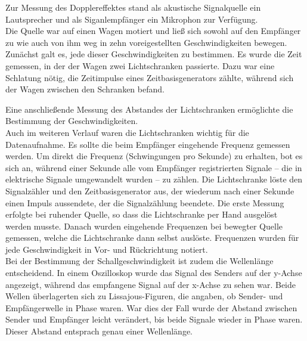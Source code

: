 Zur Messung des Dopplereffektes stand als akustische Signalquelle ein Lautsprecher und als Siganlempfänger ein Mikrophon zur Verfügung.
\\
Die Quelle war auf einen Wagen motiert und ließ sich sowohl auf den Empfänger zu wie auch von ihm weg in zehn voreigestellten Geschwindigkeiten bewegen.
Zunächst galt es, jede dieser Geschwindigkeiten zu bestimmen. Es wurde die Zeit gemessen, in der der Wagen zwei Lichtschranken passierte. Dazu war eine Schlatung nötig, die Zeitimpulse eines Zeitbasisgenerators zählte, während sich der Wagen zwischen den Schranken befand.

Eine anschließende Messung des Abstandes der Lichtschranken ermöglichte die Bestimmung der Geschwindigkeiten.
\\
Auch im weiteren Verlauf waren die Lichtschranken wichtig für die Datenaufnahme. Es sollte die beim Empfänger eingehende Frequenz gemessen werden.  Um direkt die Frequenz (Schwingungen pro Sekunde) zu erhalten, bot es sich an, während einer Sekunde alle vom Empfänger registrierten Signale -- die in elektrische Signale umgewandelt wurden -- zu zählen. Die Lichtschranke löste den Signalzähler und den Zeitbasisgenerator aus, der wiederum nach einer Sekunde einen Impuls aussendete, der die Signalzählung beendete. 
Die erste Messung erfolgte bei ruhender Quelle, so dass die Lichtschranke per Hand ausgelöst werden musste. Danach wurden eingehende Frequenzen bei bewegter Quelle gemessen, welche die Lichtschranke dann selbst auslöste. Frequenzen wurden für jede Geschwindigkeit in Vor- und Rückrichtung notiert. \\
Bei der Bestimmung der Schallgeschwindigkeit ist zudem die Wellenlänge entscheidend. In einem Oszilloskop wurde das Signal des Senders auf der y-Achse  angezeigt, während das empfangene Signal auf der x-Achse zu sehen war. Beide Wellen überlagerten sich zu Lissajous-Figuren, die angaben, ob Sender- und Empfängerwelle in Phase waren. War dies der Fall wurde der Abstand zwischen Sender und Empfänger leicht verändert, bis beide Signale wieder in Phase waren. Dieser Abstand entsprach genau einer Wellenlänge.

